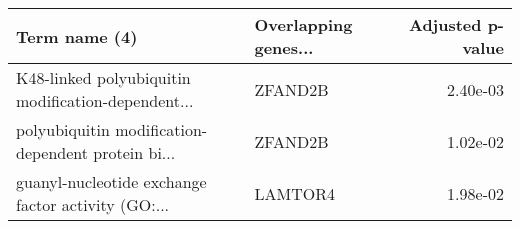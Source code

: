 \begin{tabular}{llr}
\toprule
                                     Term name (4) & Overlapping genes... &  Adjusted p-value \\
\midrule
K48-linked polyubiquitin modification-dependent... &              ZFAND2B &          2.40e-03 \\
polyubiquitin modification-dependent protein bi... &              ZFAND2B &          1.02e-02 \\
guanyl-nucleotide exchange factor activity (GO:... &              LAMTOR4 &          1.98e-02 \\
\bottomrule
\end{tabular}
